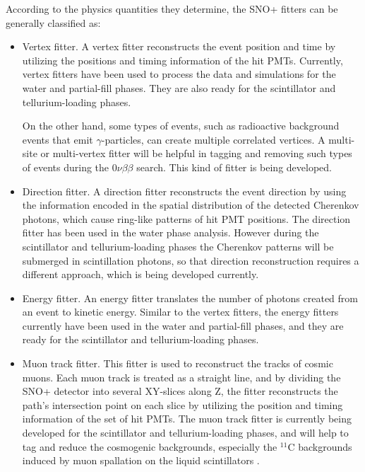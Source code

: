 According to the physics quantities they determine, the SNO+ fitters can be generally classified as:
\begin{itemize}
	\item Vertex fitter. A vertex fitter reconstructs the event position and time by utilizing the positions and timing information of the hit PMTs. Currently, vertex fitters have been used to process the data and simulations for the water and partial-fill phases. They are also ready for the scintillator and tellurium-loading phases.
	
    On the other hand, some types of events, such as radioactive background events that emit $\gamma$-particles, can create multiple correlated vertices. A multi-site or multi-vertex fitter will be helpful in tagging and removing such types of events during the $0\nu\beta\beta$ search. This kind of fitter is being developed.

	\item Direction fitter. A direction fitter reconstructs the event direction by using the information encoded in the spatial distribution of the detected Cherenkov photons, which cause ring-like patterns of hit PMT positions. The direction fitter has been used in the water phase analysis. However during the scintillator and tellurium-loading phases the Cherenkov patterns will be submerged in scintillation photons, so that direction reconstruction requires a different approach, which is being developed currently. 
	
	\item Energy fitter. An energy fitter translates the number of photons created from an event to kinetic energy. Similar to the vertex fitters, the energy fitters currently have been used in the water and partial-fill phases, and they are ready for the scintillator and tellurium-loading phases.

	\item Muon track fitter. This fitter is used to reconstruct the tracks of cosmic muons. Each muon track is treated as a straight line, and by dividing the SNO+ detector into several XY-slices along Z, the fitter reconstructs the path's intersection point on each slice by utilizing the position and timing information of the set of hit PMTs\cite{muonTrackRecon}. The muon track fitter is currently being developed for the scintillator and tellurium-loading phases, and will help to tag and reduce the cosmogenic backgrounds, especially the $^{11}$C backgrounds induced by muon spallation on the liquid scintillators \cite{sorensen2016temperature}.
\end{itemize}

